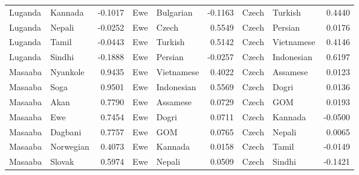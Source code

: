 \documentclass[11pt]{article} %
\begin{document}
\begin{table}
\begin{tabular}{llr@{\hspace{12pt}}llr@{\hspace{12pt}}llr}
            Luganda                      & Kannada             & -0.1017       & Ewe                 & Bulgarian           & -0.1163       & Czech               & Turkish             & 0.4440        \\
            Luganda                      & Nepali              & -0.0252       & Ewe                 & Czech               & 0.5549        & Czech               & Persian             & 0.0176        \\
            Luganda                      & Tamil               & -0.0443       & Ewe                 & Turkish             & 0.5142        & Czech               & Vietnamese          & 0.4146        \\
            Luganda                      & Sindhi              & -0.1888       & Ewe                 & Persian             & -0.0257       & Czech               & Indonesian          & 0.6197        \\
            Masaaba                      & Nyankole            & 0.9435        & Ewe                 & Vietnamese          & 0.4022        & Czech               & Assamese            & 0.0123        \\
            Masaaba                      & Soga                & 0.9501        & Ewe                 & Indonesian          & 0.5569        & Czech               & Dogri               & 0.0136        \\
            Masaaba                      & Akan                & 0.7790        & Ewe                 & Assamese            & 0.0729        & Czech               & GOM                 & 0.0193        \\
            Masaaba                      & Ewe                 & 0.7454        & Ewe                 & Dogri               & 0.0711        & Czech               & Kannada             & -0.0500       \\
            Masaaba                      & Dagbani             & 0.7757        & Ewe                 & GOM                 & 0.0765        & Czech               & Nepali              & 0.0065        \\
            Masaaba                      & Norwegian           & 0.4073        & Ewe                 & Kannada             & 0.0158        & Czech               & Tamil               & -0.0149       \\
            Masaaba                      & Slovak              & 0.5974        & Ewe                 & Nepali              & 0.0509        & Czech               & Sindhi              & -0.1421       \\

\end{tabular}
\end{table}
\end{document}
